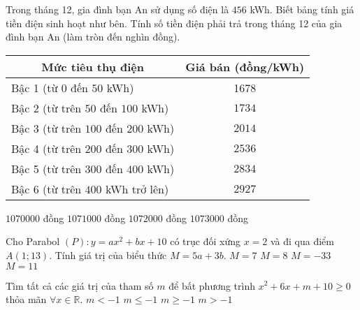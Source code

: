\begin{ex}%
Trong tháng 12, gia đình bạn An sử dụng số điện là $456$ kWh. Biết bảng tính giá tiền điện sinh hoạt như bên. Tính số tiền điện phải trả trong tháng 12 của gia đình bạn An (làm tròn đến nghìn đồng).
\begin{center}
\begin{tabular}{|l|c|}
\hline \multicolumn{1}{|c|}{ Mức tiêu thụ điện } & Giá bán (đồng/kWh) \\
\hline Bậc 1 (từ $0$ đến $50$ kWh) & 1678 \\
\hline Bậc 2 (từ trên $50$ đến $100$ kWh)& $1734$\\
\hline Bậc 3 (từ trên $100$ đến $200$ kWh)& $2014$\\
\hline Bậc 4 (từ trên $200$ đến $300$ kWh)& $2536$\\
\hline Bậc 5 (từ trên $300$ đến $400$ kWh)& $2834$\\
\hline Bậc 6 (từ trên $400$ kWh trở lên)& $2927$\\
\hline
\end{tabular}
\end{center}
		\choice
	{$1070000$ đồng}
	{$1071000$ đồng}
	{$1072000$ đồng}
	{\True $1073000$ đồng}
\end{ex}

\begin{ex}%
Cho Parabol $(P)\colon y=ax^2+bx+10$ có trục đối xứng $x=2$ và đi qua điểm $A(1;13)$. Tính giá trị của biểu thức $M=5a+3b$.
		\choice
	{\True $M=7$}
	{$M=8$}
	{$M=-33$}
	{$M=11$}
\end{ex}

\begin{ex}%
Tìm tất cả các giá trị của tham số $m$ để bất phương trình $x^2+6x+m+10\geq 0$ thỏa mãn $\forall x\in\mathbb{R}$.
		\choice
	{$m<-1$}
	{$m\leq-1$}
	{\True $m\geq-1$}
	{$m>-1$}
\end{ex}

